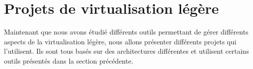 \section{Projets de virtualisation légère}
\label{section:sota}

Maintenant que nous avons étudié différents outils permettant de gérer différents aspects de la virtualisation légère, nous allons présenter différents projets qui l'utilisent. Ils sont tous basés sur des architectures différentes et utilisent certains outils présentés dans la section précédente.
